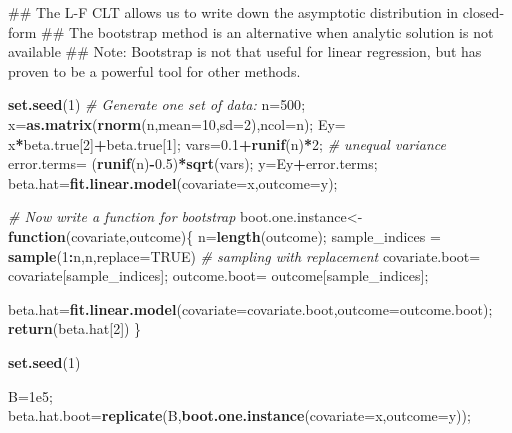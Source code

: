 \documentclass[12pt,]{book}
\newenvironment{Shaded}{\begin{snugshade}}{\end{snugshade}}
\newcommand{\KeywordTok}[1]{\textcolor[rgb]{0.13,0.29,0.53}{\textbf{#1}}}
\newcommand{\DataTypeTok}[1]{\textcolor[rgb]{0.13,0.29,0.53}{#1}}
\newcommand{\DecValTok}[1]{\textcolor[rgb]{0.00,0.00,0.81}{#1}}
\newcommand{\FloatTok}[1]{\textcolor[rgb]{0.00,0.00,0.81}{#1}}
\newcommand{\StringTok}[1]{\textcolor[rgb]{0.31,0.60,0.02}{#1}}
\newcommand{\CommentTok}[1]{\textcolor[rgb]{0.56,0.35,0.01}{\textit{#1}}}
\newcommand{\OtherTok}[1]{\textcolor[rgb]{0.56,0.35,0.01}{#1}}
\newcommand{\ControlFlowTok}[1]{\textcolor[rgb]{0.13,0.29,0.53}{\textbf{#1}}}
\newcommand{\OperatorTok}[1]{\textcolor[rgb]{0.81,0.36,0.00}{\textbf{#1}}}
\newcommand{\NormalTok}[1]{#1}
\begin{document}
\begin{Shaded}
\begin{Highlighting}[]
\NormalTok{## The L-F CLT allows us to write down the asymptotic distribution in closed-form}
\NormalTok{## The bootstrap method is an alternative when analytic solution is not available }
\NormalTok{## Note: Bootstrap is not that useful for linear regression, but has proven to be a powerful tool for other methods. }

\KeywordTok{set.seed}\NormalTok{(}\DecValTok{1}\NormalTok{)}
\CommentTok{# Generate one set of data: }
\NormalTok{n=}\DecValTok{500}\NormalTok{;}
\NormalTok{x=}\KeywordTok{as.matrix}\NormalTok{(}\KeywordTok{rnorm}\NormalTok{(n,}\DataTypeTok{mean=}\DecValTok{10}\NormalTok{,}\DataTypeTok{sd=}\DecValTok{2}\NormalTok{),}\DataTypeTok{ncol=}\NormalTok{n);}
\NormalTok{Ey=}\StringTok{ }\NormalTok{x}\OperatorTok{*}\NormalTok{beta.true[}\DecValTok{2}\NormalTok{]}\OperatorTok{+}\NormalTok{beta.true[}\DecValTok{1}\NormalTok{];}
\NormalTok{vars=}\FloatTok{0.1}\OperatorTok{+}\KeywordTok{runif}\NormalTok{(n)}\OperatorTok{*}\DecValTok{2}\NormalTok{; }\CommentTok{# unequal variance }
\NormalTok{error.terms=}\StringTok{ }\NormalTok{(}\KeywordTok{runif}\NormalTok{(n)}\OperatorTok{-}\FloatTok{0.5}\NormalTok{)}\OperatorTok{*}\KeywordTok{sqrt}\NormalTok{(vars);}
\NormalTok{y=Ey}\OperatorTok{+}\NormalTok{error.terms;}
\NormalTok{beta.hat=}\KeywordTok{fit.linear.model}\NormalTok{(}\DataTypeTok{covariate=}\NormalTok{x,}\DataTypeTok{outcome=}\NormalTok{y);}


\CommentTok{# Now write a function for bootstrap }
\NormalTok{boot.one.instance<-}\ControlFlowTok{function}\NormalTok{(covariate,outcome)\{}
\NormalTok{  n=}\KeywordTok{length}\NormalTok{(outcome);}
\NormalTok{  sample_indices =}\StringTok{ }\KeywordTok{sample}\NormalTok{(}\DecValTok{1}\OperatorTok{:}\NormalTok{n,n,}\DataTypeTok{replace=}\OtherTok{TRUE}\NormalTok{) }\CommentTok{# sampling with replacement}
\NormalTok{  covariate.boot=}\StringTok{ }\NormalTok{covariate[sample_indices]; outcome.boot=}\StringTok{ }\NormalTok{outcome[sample_indices];}
   
\NormalTok{  beta.hat=}\KeywordTok{fit.linear.model}\NormalTok{(}\DataTypeTok{covariate=}\NormalTok{covariate.boot,}\DataTypeTok{outcome=}\NormalTok{outcome.boot);}
  \KeywordTok{return}\NormalTok{(beta.hat[}\DecValTok{2}\NormalTok{]) }
\NormalTok{\}}

\KeywordTok{set.seed}\NormalTok{(}\DecValTok{1}\NormalTok{)}

\NormalTok{B=}\FloatTok{1e5}\NormalTok{;}
\NormalTok{beta.hat.boot=}\KeywordTok{replicate}\NormalTok{(B,}\KeywordTok{boot.one.instance}\NormalTok{(}\DataTypeTok{covariate=}\NormalTok{x,}\DataTypeTok{outcome=}\NormalTok{y));}
\end{Highlighting}
\end{Shaded}
\end{document}
